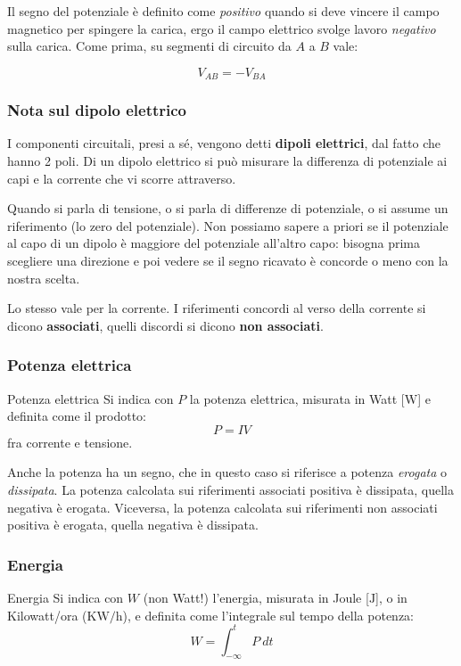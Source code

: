 \documentclass[a4paper,11pt]{article}
\begin{document}
Il segno del potenziale è definito come \textit{positivo} quando si deve vincere il campo magnetico per spingere la carica, ergo il campo elettrico svolge lavoro \textit{negativo} sulla carica.
Come prima, su segmenti di circuito da $A$ a $B$ vale:

$$
V_{AB} = -V_{BA}
$$

\subsubsection{Nota sul dipolo elettrico}
I componenti circuitali, presi a sé, vengono detti \textbf{dipoli elettrici}, dal fatto che hanno 2 poli.
Di un dipolo elettrico si può misurare la differenza di potenziale ai capi e la corrente che vi scorre attraverso.

Quando si parla di tensione, o si parla di differenze di potenziale, o si assume un riferimento (lo zero del potenziale).
Non possiamo sapere a priori se il potenziale al capo di un dipolo è maggiore del potenziale all'altro capo: bisogna prima scegliere una direzione e poi vedere se il segno ricavato è concorde o meno con la nostra scelta.

Lo stesso vale per la corrente.
I riferimenti concordi al verso della corrente si dicono \textbf{associati}, quelli discordi si dicono \textbf{non associati}.

\subsubsection{Potenza elettrica}

\begin{definition}{Potenza elettrica}
Si indica con $P$ la potenza elettrica, misurata in Watt [$\mathrm{W}$] e definita come il prodotto:
$$
	P = IV
$$
fra corrente e tensione.
\end{definition}

Anche la potenza ha un segno, che in questo caso si riferisce a potenza \textit{erogata} o \textit{dissipata}.
La potenza calcolata sui riferimenti associati positiva è dissipata, quella negativa è erogata.
Viceversa, la potenza calcolata sui riferimenti non associati positiva è erogata, quella negativa è dissipata.

\subsubsection{Energia}

\begin{definition}{Energia}
Si indica con $W$ (non Watt!) l'energia, misurata in Joule [$\mathrm{J}$], o in Kilowatt/ora ($\mathrm{KW/h}$), e definita come l'integrale sul tempo della potenza:
$$
W = \int_{-\infty}^t P \ dt 
$$
\end{definition}
\end{document}
